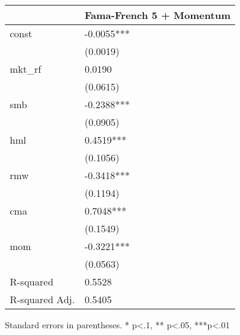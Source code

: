 \begin{table}
\caption{}
\label{}
\begin{center}
\begin{tabular}{ll}
\hline
               & Fama-French 5 + Momentum  \\
\hline
const          & -0.0055***                \\
               & (0.0019)                  \\
mkt\_rf        & 0.0190                    \\
               & (0.0615)                  \\
smb            & -0.2388***                \\
               & (0.0905)                  \\
hml            & 0.4519***                 \\
               & (0.1056)                  \\
rmw            & -0.3418***                \\
               & (0.1194)                  \\
cma            & 0.7048***                 \\
               & (0.1549)                  \\
mom            & -0.3221***                \\
               & (0.0563)                  \\
R-squared      & 0.5528                    \\
R-squared Adj. & 0.5405                    \\
\hline
\end{tabular}
\end{center}
\end{table}
\bigskip
Standard errors in parentheses. \newline 
* p<.1, ** p<.05, ***p<.01